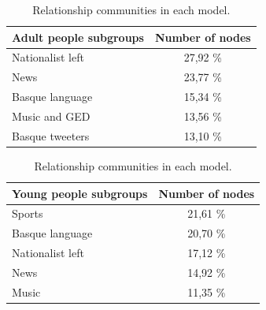 \documentclass[information,article,submit,moreauthors,pdftex,10pt,a4paper]{Definitions/mdpi}
\begin{document}
\begin{table}[H]
           \centering
           \captionsetup[subtable]{position = below}
          \captionsetup[table]{position=top}
           
           \begin{subtable}{0.45\linewidth}
               \centering
               \begin{tabular}{|l|c|}
                   \hline
                   \textbf{Adult people subgroups} & \textbf{Number of nodes} \\ \hline
                   Nationalist left & 27,92 \% \\ \hline
                   News & 23,77 \% \\ \hline
                   Basque language & 15,34 \% \\ \hline
                   Music and GED & 13,56 \% \\ \hline
                   Basque tweeters & 13,10 \% \\ \hline
               \end{tabular}
               \caption{Relationship communities of adult people.}
               \label{tab:heldu talde}
           \end{subtable}%
           \hspace*{4em}
           \begin{subtable}{0.45\linewidth}
               \centering
               \begin{tabular}{|l|c|}
                   \hline
                   \textbf{Young people subgroups} & \textbf{Number of nodes} \\ \hline
                   Sports & 21,61 \% \\ \hline
                   Basque language & 20,70 \% \\ \hline
                   Nationalist left & 17,12 \% \\ \hline
                   News & 14,92 \% \\ \hline 
                   Music & 11,35 \% \\ \hline
               \end{tabular}
                \caption{Relationship communities of young people.}
                 \label{tab:gazte talde}
           \end{subtable}
           \caption{Relationship communities in each model.}
           \label{tab:taldeak}
       \end{table}


\end{document}
